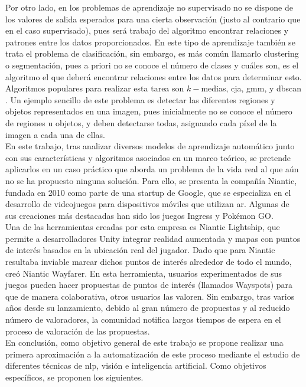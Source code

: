 	Por otro lado, en los problemas de aprendizaje no supervisado no se dispone de los valores de salida esperados para una cierta observación (justo al contrario que en el caso supervisado), pues será trabajo del algoritmo encontrar relaciones y patrones entre los datos proporcionados. En este tipo de aprendizaje también se trata el problema de clasificación, sin embargo, es más común llamarlo clustering o segmentación, pues a priori no se conoce el número de clases y cuáles son, es el algoritmo el que deberá encontrar relaciones entre los datos para determinar esto. Algoritmos populares para realizar esta tarea son $k-$medias, \gls{cja}, \gls{gmm}, y \gls{dbscan} \cite{unsup}. Un ejemplo sencillo de este problema es detectar las diferentes regiones y objetos representados en una imagen, pues inicialmente no se conoce el número de regiones u objetos, y deben detectarse todas, asignando cada píxel de la imagen a cada una de ellas. \\
	
	En este trabajo, tras analizar diversos modelos de aprendizaje automático junto con sus características y algoritmos asociados en un marco teórico, se pretende aplicarlos en un caso práctico que aborda un problema de la vida real al que aún no se ha propuesto ninguna solución. Para ello, se presenta la compañía Niantic, fundada en 2010 como parte de una startup de Google, que se especializa en el desarrollo de videojuegos para dispositivos móviles que utilizan \gls{ar}. Algunas de sus creaciones más destacadas han sido los juegos Ingress y Pokémon GO. \\
	
	Una de las herramientas creadas por esta empresa es Niantic Lightship, que permite a desarrolladores Unity integrar realidad aumentada y mapas con puntos de interés basados en la ubicación real del jugador. Dado que para Niantic resultaba inviable marcar dichos puntos de interés alrededor de todo el mundo, creó Niantic Wayfarer. En esta herramienta, usuarios experimentados de sus juegos pueden hacer propuestas de puntos de interés (llamados Wayspots) para que de manera colaborativa, otros usuarios las valoren. Sin embargo, tras varios años desde su lanzamiento, debido al gran número de propuestas y al reducido número de valoradores, la comunidad notifica largos tiempos de espera en el proceso de valoración de las propuestas. \\
	
	En conclusión, como objetivo general de este trabajo se propone realizar una primera aproximación a la automatización de este proceso mediante el estudio de diferentes técnicas de \gls{nlp}, visión e inteligencia artificial. Como objetivos específicos, se proponen los siguientes. 
	
